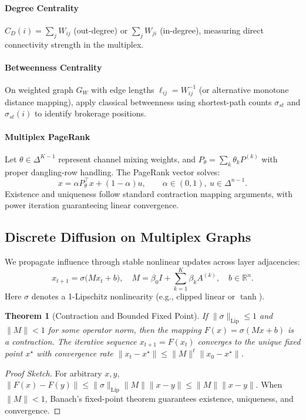 \documentclass[12pt]{article}
\theoremstyle{plain}
\newtheorem{theorem}{Theorem}
\begin{document}
\paragraph{Degree Centrality}
$C_D(i)=\sum_j W_{ij}$ (out-degree) or $\sum_j W_{ji}$ (in-degree), measuring direct connectivity strength in the multiplex.

\paragraph{Betweenness Centrality}
On weighted graph $G_W$ with edge lengths $\ell_{ij}=W_{ij}^{-1}$ (or alternative monotone distance mapping), apply classical betweenness using shortest-path counts $\sigma_{st}$ and $\sigma_{st}(i)$ to identify brokerage positions.

\paragraph{Multiplex PageRank}
Let $\theta\in\Delta^{K-1}$ represent channel mixing weights, and $P_\theta=\sum_{k}\theta_k P^{(k)}$ with proper dangling-row handling. The PageRank vector solves:
\begin{equation}
\label{eq:pr}
x=\alpha P_\theta^\top x + (1-\alpha)u,\qquad \alpha\in(0,1),\ u\in\Delta^{n-1}.
\end{equation}
Existence and uniqueness follow standard contraction mapping arguments, with power iteration guaranteeing linear convergence.

\subsection{Discrete Diffusion on Multiplex Graphs}
We propagate influence through stable nonlinear updates across layer adjacencies:
\begin{equation}
\label{eq:diffusion}
x_{t+1}=\sigma\!\Big(Mx_t+b\Big),\quad
M=\beta_0 I+\sum_{k=1}^{K}\beta_k A^{(k)},\quad b\in\mathbb{R}^n.
\end{equation}
Here $\sigma$ denotes a 1-Lipschitz nonlinearity (e.g., clipped linear or $\tanh$).

\begin{theorem}[Contraction and Bounded Fixed Point]
\label{thm:contraction}
If $\|\sigma\|_{\text{Lip}}\le 1$ and $\|M\|<1$ for some operator norm, then the mapping $F(x)=\sigma(Mx+b)$ is a contraction. The iterative sequence $x_{t+1}=F(x_t)$ converges to the unique fixed point $x^\star$ with convergence rate $\|x_{t}-x^\star\|\le \|M\|^{t}\|x_0-x^\star\|$.
\end{theorem}
\begin{proof}[Proof Sketch]
For arbitrary $x,y$, $\|F(x)-F(y)\|\le \|\sigma\|_{\text{Lip}}\|M\|\|x-y\|\le \|M\|\|x-y\|$. When $\|M\|<1$, Banach's fixed-point theorem guarantees existence, uniqueness, and convergence.
\end{proof}
\end{document}

